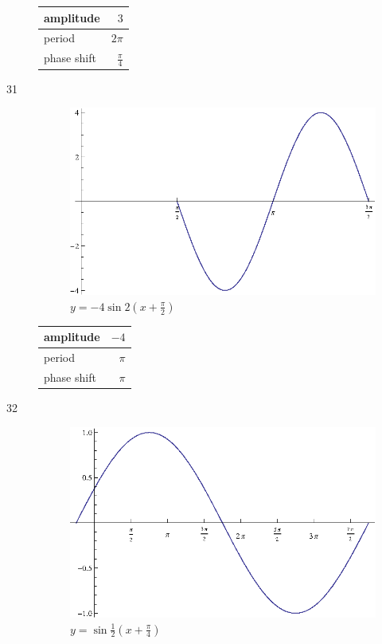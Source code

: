 \documentclass{exam}
\begin{document}
\begin{description}
        \begin{tabular}[H]{lr}
          \toprule
          amplitude & $3$ \\
          \midrule
          period & $2 \pi$ \\
          \midrule
          phase shift & $\frac{\pi}{4}$ \\
          \bottomrule
        \end{tabular}

      \item[31]
        \begin{figure}[H]
          \centering
          \includegraphics[scale=0.8]{exercise31.eps}
          \caption{$y = -4 \sin 2 \left( x + \frac{\pi}{2} \right)$}
        \end{figure}

        \begin{tabular}[H]{lr}
          \toprule
          amplitude & $-4$ \\
          \midrule
          period & $\pi$ \\
          \midrule
          phase shift & $\pi$ \\
          \bottomrule
        \end{tabular}

      \item[32]
        \begin{figure}[H]
          \centering
          \includegraphics[scale=0.8]{exercise32.eps}
          \caption{$y = \sin \frac{1}{2} \left( x + \frac{\pi}{4} \right)$}
        \end{figure}


\end{description}
\end{document}
